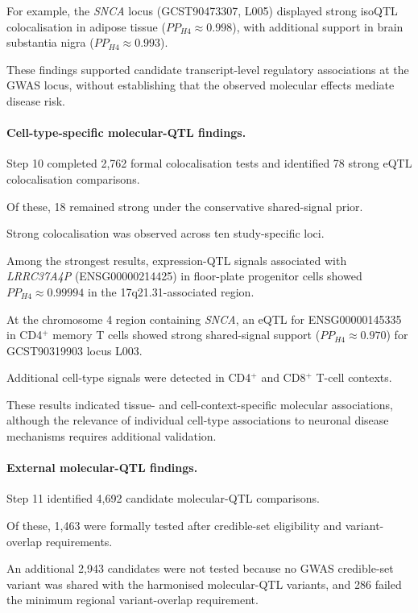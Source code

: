 \documentclass[11pt,a4paper]{article}
\begin{document}
For example, the \textit{SNCA} locus
(GCST90473307, L005) displayed strong
isoQTL colocalisation in adipose tissue
($PP_{H4}\approx0.998$), with additional
support in brain substantia nigra
($PP_{H4}\approx0.993$).

These findings supported candidate transcript-level
regulatory associations at the GWAS locus,
without establishing that the observed molecular
effects mediate disease risk.


\paragraph{Cell-type-specific molecular-QTL findings.}

Step 10 completed 2,762 formal colocalisation
tests and identified 78 strong eQTL
colocalisation comparisons.

Of these, 18 remained strong under the
conservative shared-signal prior.

Strong colocalisation was observed across
ten study-specific loci.

Among the strongest results, expression-QTL
signals associated with
\textit{LRRC37A4P} (ENSG00000214425)
in floor-plate progenitor cells showed
$PP_{H4}\approx0.99994$ in the
17q21.31-associated region.

At the chromosome 4 region containing
\textit{SNCA}, an eQTL for
ENSG00000145335 in CD4$^{+}$ memory
T cells showed strong shared-signal
support ($PP_{H4}\approx0.970$)
for GCST90319903 locus L003.

Additional cell-type signals were detected
in CD4$^{+}$ and CD8$^{+}$ T-cell contexts.

These results indicated tissue- and
cell-context-specific molecular associations,
although the relevance of individual
cell-type associations to neuronal disease
mechanisms requires additional validation.


\paragraph{External molecular-QTL findings.}

Step 11 identified 4,692 candidate
molecular-QTL comparisons.

Of these, 1,463 were formally tested after
credible-set eligibility and variant-overlap
requirements.

An additional 2,943 candidates were not tested
because no GWAS credible-set variant was shared
with the harmonised molecular-QTL variants,
and 286 failed the minimum regional
variant-overlap requirement.
\end{document}
